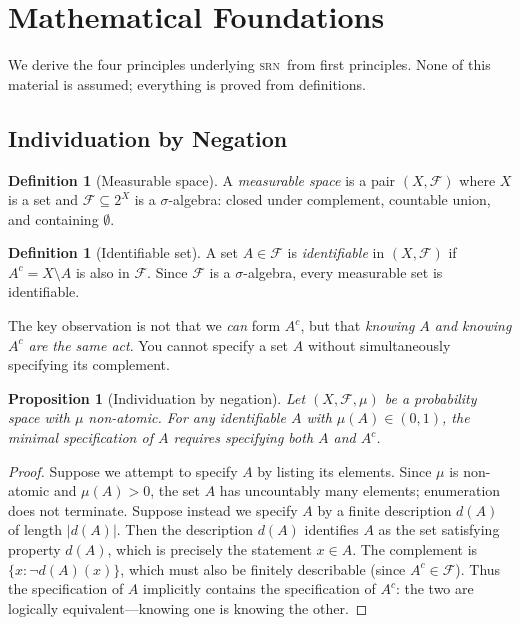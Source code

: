 \documentclass[twocolumn,11pt,a4paper]{article}
\newtheorem{proposition}[theorem]{Proposition}
\theoremstyle{definition}
\newtheorem{definition}[theorem]{Definition}
\theoremstyle{remark}
\newcommand{\srn}{\textsc{srn}}
\begin{document}
\section{Mathematical Foundations}
\label{sec:foundations}

We derive the four principles underlying \srn\ from first principles.
None of this material is assumed; everything is proved from definitions.

\subsection{Individuation by Negation}
\label{sec:indiv}

\begin{definition}[Measurable space]
A \emph{measurable space} is a pair $(X, \mathscr{F})$ where $X$ is a
set and $\mathscr{F} \subseteq 2^X$ is a $\sigma$-algebra: closed
under complement, countable union, and containing $\emptyset$.
\end{definition}

\begin{definition}[Identifiable set]
A set $A \in \mathscr{F}$ is \emph{identifiable} in $(X,\mathscr{F})$
if $A^c = X \setminus A$ is also in $\mathscr{F}$.  Since
$\mathscr{F}$ is a $\sigma$-algebra, every measurable set is
identifiable.
\end{definition}

The key observation is not that we \emph{can} form $A^c$, but that
\emph{knowing $A$ and knowing $A^c$ are the same act}.  You cannot
specify a set $A$ without simultaneously specifying its complement.

\begin{proposition}[Individuation by negation]
\label{prop:indiv}
Let $(X,\mathscr{F},\mu)$ be a probability space with $\mu$
non-atomic.  For any identifiable $A$ with $\mu(A) \in (0,1)$, the
minimal specification of $A$ requires specifying both $A$ and $A^c$.
\end{proposition}
\begin{proof}
Suppose we attempt to specify $A$ by listing its elements.  Since $\mu$
is non-atomic and $\mu(A) > 0$, the set $A$ has uncountably many
elements; enumeration does not terminate.  Suppose instead we specify
$A$ by a finite description $d(A)$ of length $|d(A)|$.  Then the
description $d(A)$ identifies $A$ as the set satisfying property
$d(A)$, which is precisely the statement $x \in A$.  The complement is
$\{x : \neg d(A)(x)\}$, which must also be finitely describable (since
$A^c \in \mathscr{F}$).  Thus the specification of $A$ implicitly
contains the specification of $A^c$: the two are logically
equivalent---knowing one is knowing the other.
\end{proof}
\end{document}

